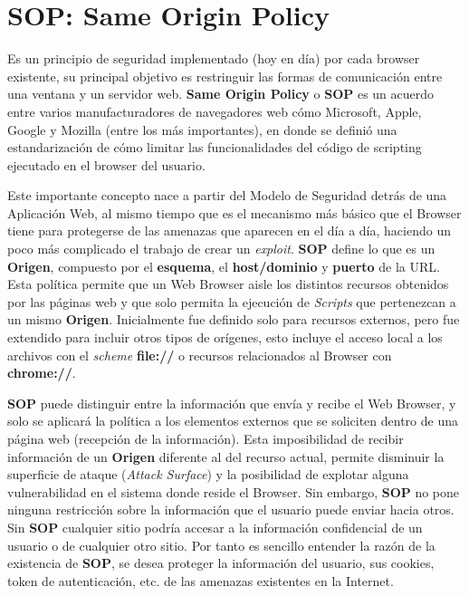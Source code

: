 \section{SOP: Same Origin Policy} %
\label{chap2:SOP}

    Es un principio de seguridad implementado (hoy en día) por cada browser existente, su principal objetivo es restringuir las formas de comunicación entre una ventana y un servidor web. \textbf{Same Origin Policy} o \textbf{SOP} es un acuerdo entre varios manufacturadores de navegadores web cómo Microsoft, Apple, Google y Mozilla (entre los más importantes), en donde se definió una estandarización de cómo limitar las funcionalidades del código de scripting ejecutado en el browser del usuario. 

    Este importante concepto nace a partir del Modelo de Seguridad detrás de una Aplicación Web, al mismo tiempo que es el mecanismo más básico que el Browser tiene para protegerse de las amenazas que aparecen en el día a día, haciendo un poco más complicado el trabajo de crear un \textit{exploit}. \textbf{SOP} define lo que es un \textbf{Origen}, compuesto por el \textbf{esquema}, el \textbf{host/dominio} y \textbf{puerto} de la URL. Esta política permite que un Web Browser aisle los distintos recursos obtenidos por las páginas web y que solo permita la ejecución de \textit{Scripts} que pertenezcan a un mismo \textbf{Origen}. Inicialmente fue definido solo para recursos externos, pero fue extendido para incluir otros tipos de orígenes, esto incluye el acceso local a los archivos con el \textit{scheme} \textbf{file://} o recursos relacionados al Browser con \textbf{chrome://}.

    \textbf{SOP} puede distinguir entre la información que envía y recibe el Web Browser, y solo se aplicará la política a los elementos externos que se soliciten dentro de una página web (recepción de la información). Esta imposibilidad de recibir información de un \textbf{Origen} diferente al del recurso actual, permite disminuir la superficie de ataque (\textit{Attack Surface}) y la posibilidad de explotar alguna vulnerabilidad en el sistema donde reside el Browser. Sin embargo, \textbf{SOP} no pone ninguna restricción sobre la información que el usuario puede enviar hacia otros. Sin \textbf{SOP} cualquier sitio podría accesar a la información confidencial de un usuario o de cualquier otro sitio. Por tanto es sencillo entender la razón de la existencia de \textbf{SOP}, se desea proteger la información del usuario, sus cookies, token de autenticación, etc. de las amenazas existentes en la Internet.


